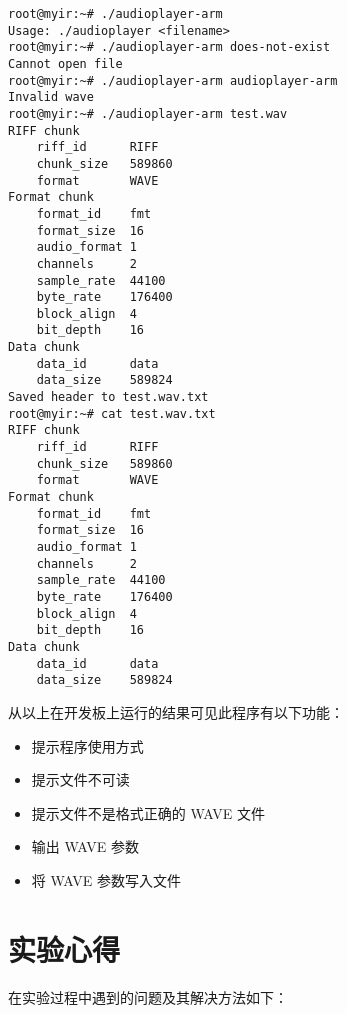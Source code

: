 \begin{multicols}{2}
\setlength{\columnseprule}{0.4pt}
\begin{verbatim}
root@myir:~# ./audioplayer-arm 
Usage: ./audioplayer <filename>
root@myir:~# ./audioplayer-arm does-not-exist
Cannot open file
root@myir:~# ./audioplayer-arm audioplayer-arm
Invalid wave
root@myir:~# ./audioplayer-arm test.wav
RIFF chunk
    riff_id      RIFF
    chunk_size   589860
    format       WAVE
Format chunk
    format_id    fmt 
    format_size  16
    audio_format 1
    channels     2
    sample_rate  44100
    byte_rate    176400
    block_align  4
    bit_depth    16
Data chunk
    data_id      data
    data_size    589824
Saved header to test.wav.txt
root@myir:~# cat test.wav.txt
RIFF chunk
    riff_id      RIFF
    chunk_size   589860
    format       WAVE
Format chunk
    format_id    fmt 
    format_size  16
    audio_format 1
    channels     2
    sample_rate  44100
    byte_rate    176400
    block_align  4
    bit_depth    16
Data chunk
    data_id      data
    data_size    589824
\end{verbatim}
\end{multicols}

从以上在开发板上运行的结果可见此程序有以下功能：
\begin{itemize}
    \item 提示程序使用方式
    \item 提示文件不可读
    \item 提示文件不是格式正确的 WAVE 文件
    \item 输出 WAVE 参数
    \item 将 WAVE 参数写入文件
\end{itemize}

\newpage

\section{实验心得}\label{sec:problem}

在实验过程中遇到的问题及其解决方法如下：

